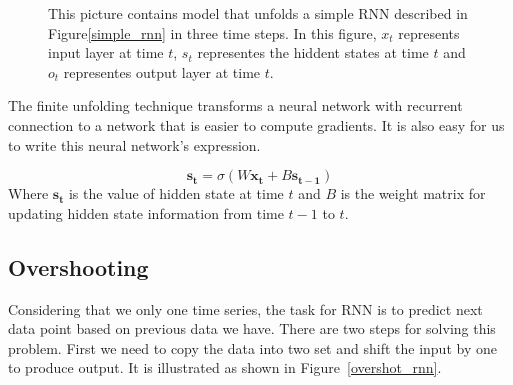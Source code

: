 \documentclass[officiallayout]{tktla}
\begin{document}
\begin{figure}[h!]
  \caption{This picture contains model that unfolds a simple RNN described in Figure\ref{simple_rnn} in three time steps. In this figure, $x_t$ represents input layer at time $t$, $s_t$ representes the hiddent states at time $t$ and $o_t$ representes output layer at time $t$.}\label{unfolded_simple_rnn}
\end{figure}

The finite unfolding technique transforms a neural network with recurrent connection to a network that is easier to compute gradients. It is also easy for us to write this neural network's expression.

\begin{equation}
\mathbf{s_{t}} = \sigma(W\mathbf{x_t} + B\mathbf{s_{t-1}})\label{internal_state_fomula}
\end{equation}
Where $\mathbf{s_t}$ is the value of hidden state at time $t$ and $B$ is the weight matrix for updating hidden state information from time $t-1$ to $t$.


\subsection{Overshooting}
Considering that we only one time series, the task for RNN is to predict next data point based on previous data we have. There are two steps for solving this problem. First we need to copy the data into two set and shift the input by one to produce output. It is illustrated as shown in Figure~\ref{overshot_rnn}.
\end{document}
